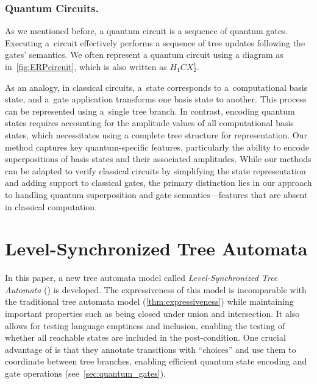 \subsubsection{Quantum Circuits.} As we mentioned before, a quantum circuit is a
sequence of quantum gates. Executing a~circuit effectively performs a sequence of tree updates
following the gates' semantics. We often represent a quantum circuit using a
diagram as in~\cref{fig:ERPcircuit}, which is also written as $H_1 CX^1_2$.

As an analogy, in classical circuits, a~state corresponds to a~computational
basis state, and a~gate application transforms one basis state to another.
This process can be represented using a~single tree branch.
In contrast, encoding quantum states requires accounting for the amplitude values of all computational basis states, which necessitates using a complete tree structure for representation.
Our method captures key quantum-specific features, particularly the ability to
encode superpositions of basis states and their associated amplitudes.
While our methods can be adapted to verify classical circuits by simplifying
the state representation and adding support to classical gates, the primary
distinction lies in our approach to handling quantum superposition and gate
semantics---features that are absent in classical computation.


\vspace{-0.0mm}
\section{Level-Synchronized Tree Automata}\label{sec:cta}
\vspace{-0.0mm}

In this paper, a new tree automata model called \emph{Level-Synchronized Tree Automata} (\lstas) is developed.
The expressiveness of this model is incomparable with the traditional tree automata model (\cref{thm:expressiveness}) while
maintaining important properties such as being closed under union and intersection. It also allows for testing language emptiness and inclusion, enabling the testing of whether all reachable states are included in the post-condition.
One crucial advantage of \lstas is that they annotate transitions with ``choices'' and use them to
coordinate between tree branches, enabling efficient quantum state encoding and gate operations (see~\cref{sec:quantum_gates}).

